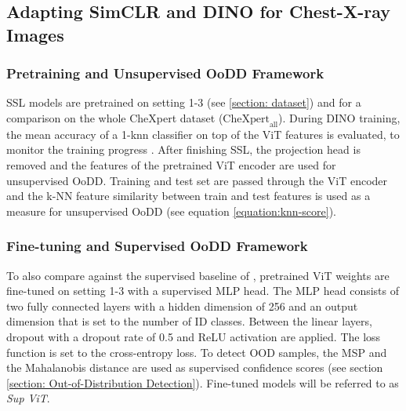 \subsection{Adapting SimCLR and DINO for Chest-X-ray Images}
\label{section: adapted-methods}
\subsubsection{Pretraining and Unsupervised OoDD Framework}
SSL models are pretrained on setting 1-3 (see \ref{section: dataset}) and for a comparison on the whole CheXpert dataset ($\text{CheXpert}_\text{all}$).
During  DINO training, the mean accuracy of a 1-knn classifier on top of the ViT features is evaluated, to monitor the training progress \citep{Wu2018,Caron2021}.
After finishing SSL, the projection head is removed \citep{Caron2021,Chen2020} and the features of the pretrained ViT encoder are used for unsupervised OoDD.
Training and test set are passed through the ViT encoder and the k-NN feature similarity between train and test features is used as a measure for unsupervised OoDD (see equation \ref{equation:knn-score}).
\par
\subsubsection{Fine-tuning and Supervised OoDD Framework}
To also compare against the supervised baseline of \citep{Berger2021}, pretrained ViT weights are fine-tuned on setting 1-3 with a supervised MLP head.
The MLP head consists of two fully connected layers with a hidden dimension of 256 and an output dimension that is set to the number of ID classes.
Between the linear layers, dropout with a dropout rate of 0.5 \citep{Srivastava2014} and ReLU activation \citep{Agarap2018} are applied.
The loss function is set to the cross-entropy loss. 
To detect OOD samples, the MSP and the Mahalanobis distance are used as supervised confidence scores (see section \ref{section: Out-of-Distribution Detection}).
Fine-tuned models will be referred to as \textit{Sup ViT}.
\par
